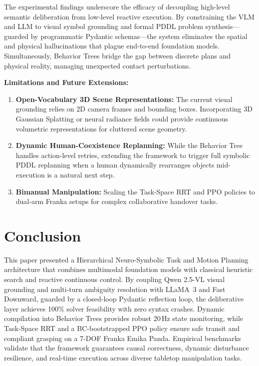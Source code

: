 \documentclass[conference]{IEEEtran}
\begin{document}
The experimental findings underscore the efficacy of decoupling high-level semantic deliberation from low-level reactive execution. By constraining the VLM and LLM to visual symbol grounding and formal PDDL problem synthesis—guarded by programmatic Pydantic schemas—the system eliminates the spatial and physical hallucinations that plague end-to-end foundation models. Simultaneously, Behavior Trees bridge the gap between discrete plans and physical reality, managing unexpected contact perturbations.

\textbf{Limitations and Future Extensions:}
\begin{enumerate}
    \item \textbf{Open-Vocabulary 3D Scene Representations:} The current visual grounding relies on 2D camera frames and bounding boxes. Incorporating 3D Gaussian Splatting or neural radiance fields could provide continuous volumetric representations for cluttered scene geometry.
    \item \textbf{Dynamic Human-Coexistence Replanning:} While the Behavior Tree handles action-level retries, extending the framework to trigger full symbolic PDDL replanning when a human dynamically rearranges objects mid-execution is a natural next step.
    \item \textbf{Bimanual Manipulation:} Scaling the Task-Space RRT and PPO policies to dual-arm Franka setups for complex collaborative handover tasks.
\end{enumerate}

\section{Conclusion}
\label{sec:conclusion}

This paper presented a Hierarchical Neuro-Symbolic Task and Motion Planning architecture that combines multimodal foundation models with classical heuristic search and reactive continuous control. By coupling Qwen 2.5-VL visual grounding and multi-turn ambiguity resolution with LLaMA~3 and Fast Downward, guarded by a closed-loop Pydantic reflection loop, the deliberative layer achieves 100\% solver feasibility with zero syntax crashes. Dynamic compilation into Behavior Trees provides robust 20\,Hz state monitoring, while Task-Space RRT and a BC-bootstrapped PPO policy ensure safe transit and compliant grasping on a 7-DOF Franka Emika Panda. Empirical benchmarks validate that the framework guarantees causal correctness, dynamic disturbance resilience, and real-time execution across diverse tabletop manipulation tasks.
\end{document}
